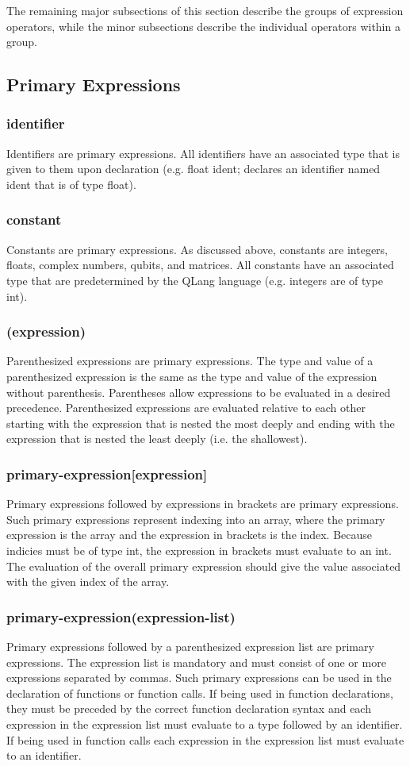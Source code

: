
The remaining major subsections of this section describe the groups of expression operators, while the minor subsections describe the individual operators within a group.
\subsection{Primary Expressions}
\subsubsection{identifier}
Identifiers are primary expressions. All identifiers have an associated type that is given to them upon declaration (e.g. float ident; declares an identifier named ident that is of type float).
\subsubsection{constant}
Constants are primary expressions. As discussed above, constants are integers, floats, complex numbers, qubits, and matrices. All constants have an associated type that are predetermined by the QLang language (e.g. integers are of type int).
\subsubsection{(expression)}
Parenthesized expressions are primary expressions. The type and value of a parenthesized expression is the same as the type and value of the expression without parenthesis. Parentheses allow expressions to be evaluated in a desired precedence. Parenthesized expressions are evaluated relative to each other starting with the expression that is nested the most deeply and ending with the expression that is nested the least deeply (i.e. the shallowest).
\subsubsection{primary-expression[expression]}
Primary expressions followed by expressions in brackets are primary expressions. Such primary expressions represent indexing into an array, where the primary expression is the array and the expression in brackets is the index. Because indicies must be of type int, the expression in brackets must evaluate to an int. The evaluation of the overall primary expression should give the value associated with the given index of the array.
\subsubsection{primary-expression(expression-list)}
Primary expressions followed by a parenthesized expression list are primary expressions. The expression list is mandatory and must consist of one or more expressions separated by commas. Such primary expressions can be used in the declaration of functions or function calls. If being used in function declarations, they must be preceded by the correct function declaration syntax and each expression in the expression list must evaluate to a type followed by an identifier. If being used in function calls each expression in the expression list must evaluate to an identifier.
